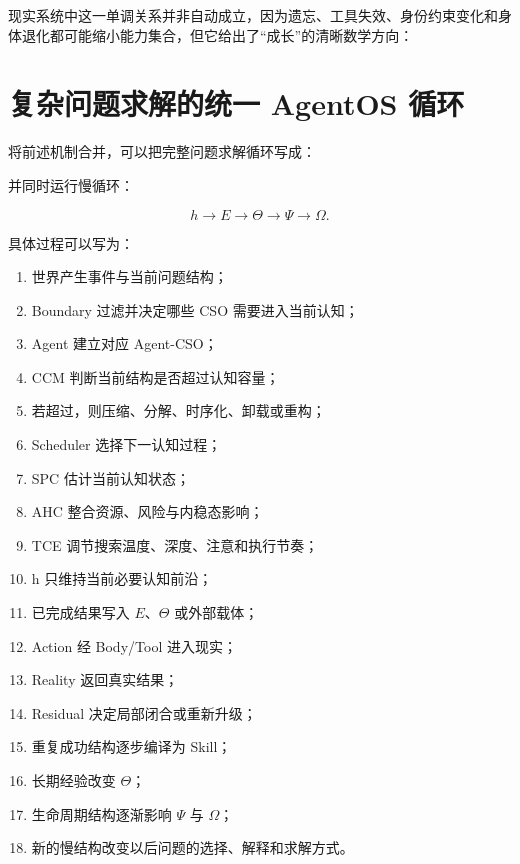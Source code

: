 现实系统中这一单调关系并非自动成立，因为遗忘、工具失效、身份约束变化和身体退化都可能缩小能力集合，但它给出了“成长”的清晰数学方向：

\begin{statementbox}
\centering
{}
\end{statementbox}

\section{复杂问题求解的统一 AgentOS 循环}

将前述机制合并，可以把完整问题求解循环写成：

\begin{statementbox}
\centering
{}
\end{statementbox}

并同时运行慢循环：

\begin{equation}
h
\rightarrow
E
\rightarrow
\Theta
\rightarrow
\Psi
\rightarrow
\Omega.
\end{equation}

具体过程可以写为：

\begin{enumerate}
    \item 世界产生事件与当前问题结构；
    \item Boundary 过滤并决定哪些 CSO 需要进入当前认知；
    \item Agent 建立对应 Agent-CSO；
    \item CCM 判断当前结构是否超过认知容量；
    \item 若超过，则压缩、分解、时序化、卸载或重构；
    \item Scheduler 选择下一认知过程；
    \item SPC 估计当前认知状态；
    \item AHC 整合资源、风险与内稳态影响；
    \item TCE 调节搜索温度、深度、注意和执行节奏；
    \item h 只维持当前必要认知前沿；
    \item 已完成结果写入 $E$、$\Theta$ 或外部载体；
    \item Action 经 Body/Tool 进入现实；
    \item Reality 返回真实结果；
    \item Residual 决定局部闭合或重新升级；
    \item 重复成功结构逐步编译为 Skill；
    \item 长期经验改变 $\Theta$；
    \item 生命周期结构逐渐影响 $\Psi$ 与 $\Omega$；
    \item 新的慢结构改变以后问题的选择、解释和求解方式。
\end{enumerate}

